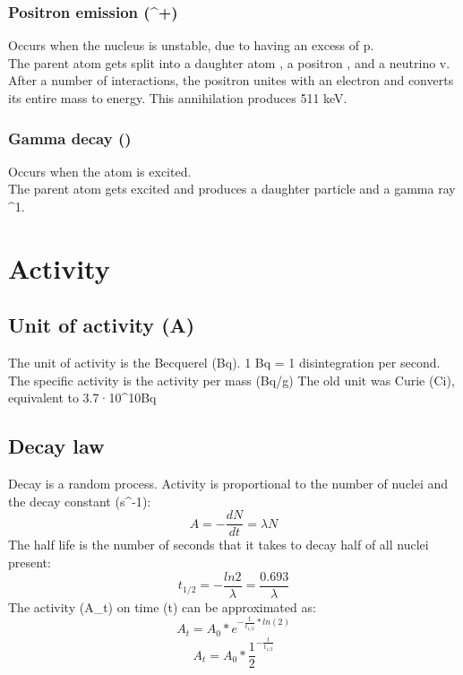 \subsubsection{Positron emission (\beta^{+})}
Occurs when the nucleus is unstable, due to having an excess of p.\\
The parent atom  gets split into a daughter atom , a positron , and a neutrino v.
After a number of interactions, the positron unites with an electron and converts its entire mass to energy. This annihilation produces 511 keV.
\subsubsection{Gamma decay (\gamma)}
Occurs when the atom is excited.\\
The parent atom  gets excited and produces a daughter particle  and a gamma ray \gamma^{1}.
\section{Activity}
\subsection{Unit of activity (A)}
The unit of activity is the Becquerel (Bq). 1 Bq = 1 disintegration per second.
The specific activity is the activity per mass (Bq/g)
The old unit was Curie (Ci), equivalent to 3.7·10^{10}Bq
 \subsection{Decay law}
 Decay is a random process. 
Activity is proportional to the number of nuclei and the decay constant \lambda (s^{-1}):
\[ A = -\frac{dN}{dt} = \lambda N \]
The half life is the number of seconds that it takes to decay half of all nuclei present:
\[ t_{1/2} = -\frac{ln2}{\lambda} = \frac{0.693}{\lambda} \]
The activity (A_t) on time (t) can be approximated as:
\[ A_{t} = A_0 * e^{-\frac{t}{t_{1/2}}*ln(2)} \]
\[ A_{t} = A_0 * \frac{1}{2}^{-\frac{t}{t_{1/2}}} \]
